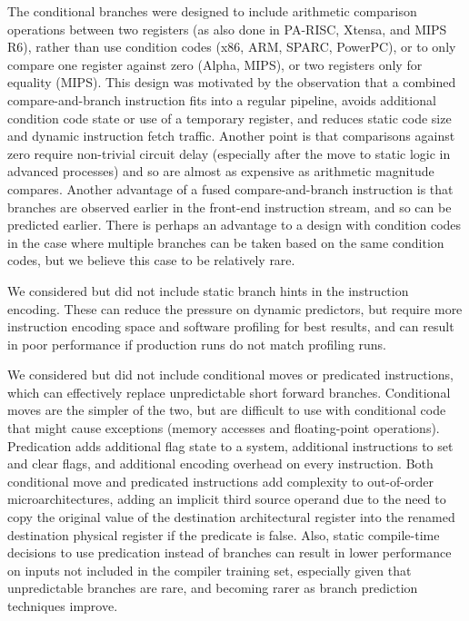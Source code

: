 \begin{commentary}
The conditional branches were designed to include arithmetic
comparison operations between two registers (as also done in PA-RISC,
Xtensa, and MIPS R6), rather than use condition codes (x86, ARM, SPARC,
PowerPC), or to only compare one register against zero (Alpha, MIPS),
or two registers only for equality (MIPS).  This design was motivated
by the observation that a combined compare-and-branch instruction fits
into a regular pipeline, avoids additional condition code state or use
of a temporary register, and reduces static code size and dynamic
instruction fetch traffic.  Another point is that comparisons against
zero require non-trivial circuit delay (especially after the move to
static logic in advanced processes) and so are almost as expensive as
arithmetic magnitude compares.  Another advantage of a fused
compare-and-branch instruction is that branches are observed earlier
in the front-end instruction stream, and so can be predicted earlier.
There is perhaps an advantage to a design with condition codes in the
case where multiple branches can be taken based on the same condition
codes, but we believe this case to be relatively rare.

We considered but did not include static branch hints in the
instruction encoding.  These can reduce the pressure on dynamic
predictors, but require more instruction encoding space and
software profiling for best results, and can result in poor
performance if production runs do not match profiling runs.

We considered but did not include conditional moves or predicated
instructions, which can effectively replace unpredictable short
forward branches.  Conditional moves are the simpler of the two, but
are difficult to use with conditional code that might cause exceptions
(memory accesses and floating-point operations).  Predication adds
additional flag state to a system, additional instructions to set and
clear flags, and additional encoding overhead on every instruction.
Both conditional move and predicated instructions add complexity to
out-of-order microarchitectures, adding an implicit third source
operand due to the need to copy the original value of the destination
architectural register into the renamed destination physical register
if the predicate is false.  Also, static compile-time decisions to use
predication instead of branches can result in lower performance on
inputs not included in the compiler training set, especially given
that unpredictable branches are rare, and becoming rarer as branch
prediction techniques improve.


\end{commentary}
